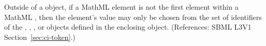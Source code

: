 Outside of a \FunctionDefinition object, if a MathML  element is
not the first element within a MathML , then the 
element's value may only be chosen from the set of identifiers of the
\Species, \Compartment, \Parameter, \SpeciesReference or \Reaction objects
defined in the enclosing \Model object.  (References: SBML L3V1
Section~\ref{sec:ci-token}.)
